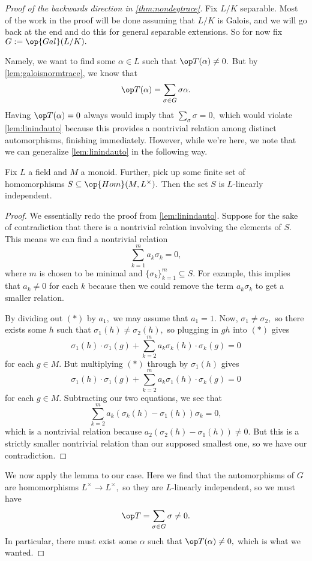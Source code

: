 \begin{proof}[Proof of the backwards direction in \autoref{thm:nondegtrace}]
	Fix $L/K$ separable. Most of the work in the proof will be done assuming that $L/K$ is Galois, and we will go back at the end and do this for general separable extensions. So for now fix $G:=\op{Gal}(L/K).$

	Namely, we want to find some $\alpha\in L$ such that $\op T(\alpha)\ne0.$ But by \autoref{lem:galoisnormtrace}, we know that
	\[\op T(\alpha)=\sum_{\sigma\in G}\sigma\alpha.\]
	Having $\op T(\alpha)=0$ always would imply that $\sum_\sigma\sigma=0,$ which would violate \autoref{lem:linindauto} because this provides a nontrivial relation among distinct automorphisms, finishing immediately. However, while we're here, we note that we can generalize \autoref{lem:linindauto} in the following way.
	\begin{lemma}[Artin]
		Fix $L$ a field and $M$ a monoid. Further, pick up some finite set of homomorphisms $S\subseteq\op{Hom}(M,L^\times).$ Then the set $S$ is $L$-linearly independent.
	\end{lemma}
	\begin{proof}
		We essentially redo the proof from \autoref{lem:linindauto}. Suppose for the sake of contradiction that there is a nontrivial relation involving the elements of $S.$ This means we can find a nontrivial relation
		\[\sum_{k=1}^ma_k\sigma_k=0,\tag{$*$}\]
		where $m$ is chosen to be minimal and $\{\sigma_k\}_{k=1}^m\subseteq S.$ For example, this implies that $a_k\ne0$ for each $k$ because then we could remove the term $a_k\sigma_k$ to get a smaller relation.
		
		By dividing out $(*)$ by $a_1,$ we may assume that $a_1=1.$ Now, $\sigma_1\ne\sigma_2,$ so there exists some $h$ such that $\sigma_1(h)\ne\sigma_2(h),$ so plugging in $gh$ into $(*)$ gives
		\[\sigma_1(h)\cdot\sigma_1(g)+\sum_{k=2}^ma_k\sigma_k(h)\cdot\sigma_k(g)=0\]
		for each $g\in M.$ But multiplying $(*)$ through by $\sigma_1(h)$ gives
		\[\sigma_1(h)\cdot\sigma_1(g)+\sum_{k=2}^ma_k\sigma_1(h)\cdot\sigma_k(g)=0\]
		for each $g\in M.$ Subtracting our two equations, we see that
		\[\sum_{k=2}^ma_k(\sigma_k(h)-\sigma_1(h))\sigma_k=0,\]
		which is a nontrivial relation because $a_2(\sigma_2(h)-\sigma_1(h))\ne0.$ But this is a strictly smaller nontrivial relation than our supposed smallest one, so we have our contradiction.
	\end{proof}
	We now apply the lemma to our case. Here we find that the automorphisms of $G$ are homomorphisms $L^\times\to L^\times,$ so they are $L$-linearly independent, so we must have
	\[\op T=\sum_{\sigma\in G}\sigma\ne0.\]
	In particular, there must exist some $\alpha$ such that $\op T(\alpha)\ne0,$ which is what we wanted.


\end{proof}
